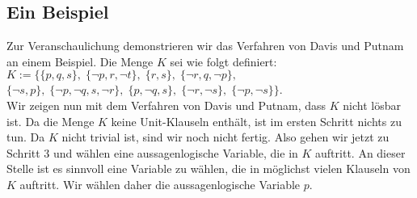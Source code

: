 \subsection{Ein Beispiel}
Zur Veranschaulichung demonstrieren wir das Verfahren von Davis und Putnam an einem Beispiel.
Die Menge $K$ sei wie folgt definiert: \\[0.2cm]
\hspace*{1.3cm} $K := \Big\{ \{p, q, s\},\; \{\neg p, r, \neg t\},\;  \{r, s\},\; \{\neg r, q, \neg p\},$ \\
\hspace*{2.5cm} $\{\neg s, p\},\; \{\neg p, \neg q, s, \neg r\},\; \{p, \neg q, s\},\; \{\neg r, \neg s\},\; \{\neg p, \neg s\} \Big\}  $. \\[0.2cm]
Wir zeigen nun mit dem Verfahren von Davis und Putnam, dass $K$ nicht l\"{o}sbar ist.  Da die
Menge $K$ keine Unit-Klauseln enth\"{a}lt, ist im ersten Schritt nichts zu tun.  Da $K$ nicht
trivial ist, sind wir noch nicht fertig.  Also gehen wir jetzt zu Schritt 3 und w\"{a}hlen
eine aussagenlogische Variable, die in $K$ auftritt.  An dieser Stelle ist es sinnvoll
eine Variable zu w\"{a}hlen, die in m\"{o}glichst vielen Klauseln von $K$ auftritt.  Wir w\"{a}hlen
daher die aussagenlogische Variable $p$.
